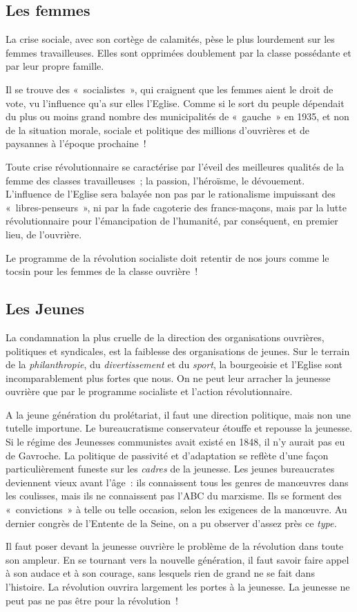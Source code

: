 \documentclass[french,twoside]{book} %
\begin{document}
\subsection[{Les femmes}]{Les femmes}
\noindent La crise sociale, avec son cortège de calamités, pèse le plus lourdement sur les femmes travailleuses. Elles sont opprimées doublement par la classe possédante et par leur propre famille.\par
Il se trouve des « socialistes », qui craignent que les femmes aient le droit de vote, vu l’influence qu’a sur elles l’Eglise. Comme si le sort du peuple dépendait du plus ou moins grand nombre des municipalités de « gauche » en 1935, et non de la situation morale, sociale  et politique des millions d’ouvrières et de paysannes à l’époque prochaine !\par
Toute crise révolutionnaire se caractérise par l’éveil des meilleures qualités de la femme des classes travailleuses ; la passion, l’héroïsme, le dévouement. L’influence de l’Eglise sera balayée non pas par le rationalisme impuissant des « libres-penseurs », ni par la fade cagoterie des francs-maçons, mais par la lutte révolutionnaire pour l’émancipation de l’humanité, par conséquent, en premier lieu, de l’ouvrière.\par
Le programme de la révolution socialiste doit retentir de nos jours comme le tocsin pour les femmes de la classe ouvrière !
\subsection[{Les Jeunes}]{Les Jeunes}
\noindent La condamnation la plus cruelle de la direction des organisations ouvrières, politiques et syndicales, est la faiblesse des organisations de jeunes. Sur le terrain de la \emph{philanthropie}, du \emph{divertissement} et du \emph{sport}, la bourgeoisie et l’Eglise sont incomparablement plus fortes que nous. On ne peut leur arracher la jeunesse ouvrière que par le programme socialiste et l’action révolutionnaire.\par
A la jeune génération du prolétariat, il faut une direction politique, mais non une tutelle importune. Le bureaucratisme conservateur étouffe et repousse la jeunesse. Si le régime des Jeunesses communistes avait existé en 1848, il n’y aurait pas eu de Gavroche. La politique de passivité et d’adaptation se reflète d’une façon particulièrement funeste sur les \emph{cadres} de la jeunesse. Les jeunes bureaucrates deviennent vieux avant l’âge : ils connaissent tous les genres de manœuvres dans les coulisses, mais ils ne connaissent pas l’ABC du marxisme. Ils se forment des « convictions » à telle ou telle occasion, selon les exigences de la manœuvre. Au dernier congrès de  l’Entente de la Seine, on a pu observer d’assez près ce \emph{type.}\par
Il faut poser devant la jeunesse ouvrière le problème de la révolution dans toute son ampleur. En se tournant vers la nouvelle génération, il faut savoir faire appel à son audace et à son courage, sans lesquels rien de grand ne se fait dans l’histoire. La révolution ouvrira largement les portes à la jeunesse. La jeunesse ne peut pas ne pas être pour la révolution !
\end{document}

